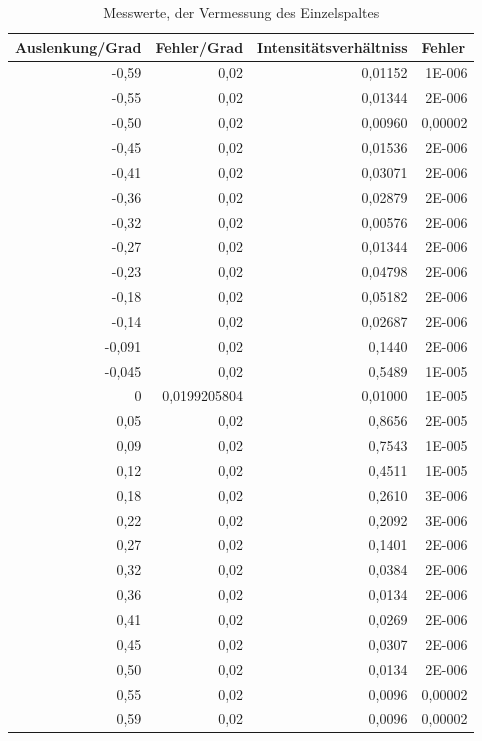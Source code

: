 \documentclass[12pt]{scrartcl}
\begin{document}
\begin{table}[H]
\caption{Messwerte, der Vermessung des Einzelspaltes}
\begin{center}
\begin{tabular}{|r|r|r|r|}
\hline
\multicolumn{1}{|l|}{Auslenkung/Grad} & \multicolumn{1}{l|}{Fehler/Grad} & \multicolumn{1}{l|}{Intensitätsverhältniss} & \multicolumn{1}{l|}{Fehler} \\ \hline
-0,59 & 0,02 & 0,01152 & 1E-006 \\ \hline
-0,55 & 0,02 & 0,01344 & 2E-006 \\ \hline
-0,50 & 0,02 & 0,00960 & 0,00002 \\ \hline
-0,45 & 0,02 & 0,01536 & 2E-006 \\ \hline
-0,41 & 0,02 & 0,03071 & 2E-006 \\ \hline
-0,36 & 0,02 & 0,02879 & 2E-006 \\ \hline
-0,32 & 0,02 & 0,00576 & 2E-006 \\ \hline
-0,27 & 0,02 & 0,01344 & 2E-006 \\ \hline
-0,23 & 0,02 & 0,04798 & 2E-006 \\ \hline
-0,18 & 0,02 & 0,05182 & 2E-006 \\ \hline
-0,14 & 0,02 & 0,02687 & 2E-006 \\ \hline
-0,091 & 0,02 & 0,1440 & 2E-006 \\ \hline
-0,045 & 0,02 & 0,5489 & 1E-005 \\ \hline
0 & 0,0199205804 & 0,01000 & 1E-005 \\ \hline
0,05 & 0,02 & 0,8656 & 2E-005 \\ \hline
0,09 & 0,02 & 0,7543 & 1E-005 \\ \hline
0,12 & 0,02 & 0,4511 & 1E-005 \\ \hline
0,18 & 0,02 & 0,2610 & 3E-006 \\ \hline
0,22 & 0,02 & 0,2092 & 3E-006 \\ \hline
0,27 & 0,02 & 0,1401 & 2E-006 \\ \hline
0,32 & 0,02 & 0,0384 & 2E-006 \\ \hline
0,36 & 0,02 & 0,0134 & 2E-006 \\ \hline
0,41 & 0,02 & 0,0269 & 2E-006 \\ \hline
0,45 & 0,02 & 0,0307 & 2E-006 \\ \hline
0,50 & 0,02 & 0,0134 & 2E-006 \\ \hline
0,55 & 0,02 & 0,0096 & 0,00002 \\ \hline
0,59 & 0,02 & 0,0096 & 0,00002 \\ \hline
\end{tabular}
\end{center}
\label{tab:a_1_m}
\end{table}
\end{document}
